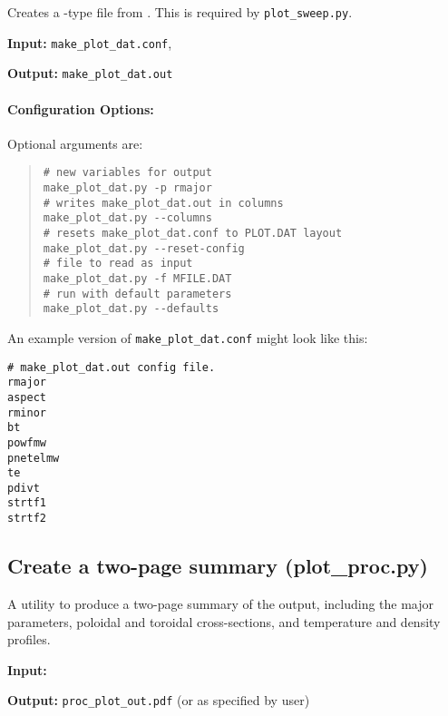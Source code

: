 Creates a \plotdat-type file from \mfile.  This is required by \texttt{plot\_sweep.py}. 

\begin{description}
\item{\textbf{Input:}}
\verb|make_plot_dat.conf|, \mfile\
                                
\item{\textbf{Output:}}
\verb|make_plot_dat.out|
\end{description}

\paragraph{Configuration Options:}

Optional arguments are:
\begin{quote} 
\begin{verbatim}
# new variables for output
make_plot_dat.py -p rmajor
# writes make_plot_dat.out in columns 
make_plot_dat.py --columns
# resets make_plot_dat.conf to PLOT.DAT layout
make_plot_dat.py --reset-config
# file to read as input
make_plot_dat.py -f MFILE.DAT 
# run with default parameters
make_plot_dat.py --defaults
\end{verbatim}
\end{quote}

An example version of \texttt{make\_plot\_dat.conf} might look like this:
\begin{framed}
\begin{verbatim}
# make_plot_dat.out config file.
rmajor
aspect
rminor
bt
powfmw
pnetelmw
te
pdivt
strtf1
strtf2
\end{verbatim}
\end{framed}

\subsection{Create a two-page summary (plot\_proc.py)}

A utility to produce a two-page summary of the output, including the major
parameters, poloidal and toroidal cross-sections, and temperature and density profiles.

\begin{description}
\item{\textbf{Input:}}
 \mfile
                                
\item{\textbf{Output:}}
\verb|proc_plot_out.pdf| (or as specified by user)
\end{description}

